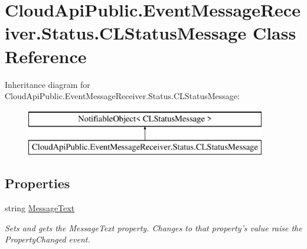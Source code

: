 \hypertarget{class_cloud_api_public_1_1_event_message_receiver_1_1_status_1_1_c_l_status_message}{\section{Cloud\-Api\-Public.\-Event\-Message\-Receiver.\-Status.\-C\-L\-Status\-Message Class Reference}
\label{class_cloud_api_public_1_1_event_message_receiver_1_1_status_1_1_c_l_status_message}
}
Inheritance diagram for Cloud\-Api\-Public.\-Event\-Message\-Receiver.\-Status.\-C\-L\-Status\-Message\-:\begin{figure}[H]
\begin{center}
\leavevmode
\includegraphics[height=2.000000cm]{class_cloud_api_public_1_1_event_message_receiver_1_1_status_1_1_c_l_status_message}
\end{center}
\end{figure}
\subsection*{Properties}
\begin{DoxyCompactItemize}
\item 
string \hyperlink{class_cloud_api_public_1_1_event_message_receiver_1_1_status_1_1_c_l_status_message_ae80ea81cad70744384fe86b8c0fb3126}{Message\-Text}
\begin{DoxyCompactList}\small\item\em Sets and gets the Message\-Text property. Changes to that property's value raise the Property\-Changed event. \end{DoxyCompactList}\end{DoxyCompactItemize}


